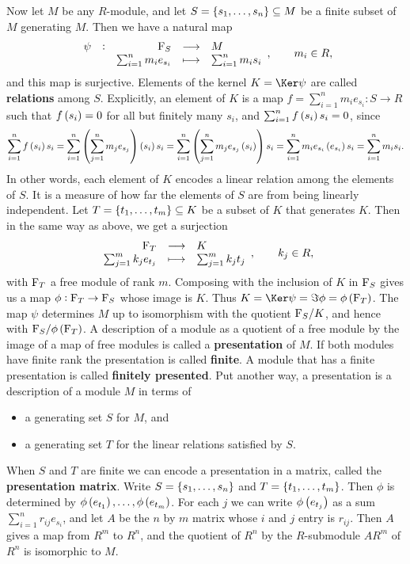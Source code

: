 Now let $ M $ be any $ R $-module, and let $ S = \cbr{s_1, \dots, s_n} \subseteq M $ be a finite subset of $ M $ generating $ M $. Then we have a natural map
$$ \function[\psi]{\F_S}{M}{\sum_{i = 1}^n m_ie_{s_i}}{\sum_{i = 1}^n m_is_i}, \qquad m_i \in R, $$
and this map is surjective. Elements of the kernel $ K = \Ker \psi $ are called \textbf{relations} among $ S $. Explicitly, an element of $ K $ is a map $ f = \sum_{i = 1}^n m_ie_{s_i} : S \to R $ such that $ f\br{s_i} = 0 $ for all but finitely many $ s_i $, and $ \sum_{i = 1}^n f\br{s_i}s_i = 0 $, since
$$ \sum_{i = 1}^n f\br{s_i}s_i = \sum_{i = 1}^n \br{\sum_{j = 1}^n m_je_{s_j}}\br{s_i}s_i = \sum_{i = 1}^n \br{\sum_{j = 1}^n m_je_{s_j}\br{s_i}}s_i = \sum_{i = 1}^n m_ie_{s_i}\br{e_{s_i}}s_i = \sum_{i = 1}^n m_is_i. $$
In other words, each element of $ K $ encodes a linear relation among the elements of $ S $. It is a measure of how far the elements of $ S $ are from being linearly independent. Let $ T = \cbr{t_1, \dots, t_m} \subseteq K $ be a subset of $ K $ that generates $ K $. Then in the same way as above, we get a surjection
$$ \function{\F_T}{K}{\sum_{j = 1}^m k_je_{t_j}}{\sum_{j = 1}^m k_jt_j}, \qquad k_j \in R, $$
with $ \mathrm{F}_T $ a free module of rank $ m $. Composing with the inclusion of $ K $ in $ \mathrm{F}_S $ gives us a map $ \phi : \mathrm{F}_T \to \mathrm{F}_S $ whose image is $ K $. Thus $ K = \Ker \psi = \Im \phi = \phi\br{\F_T} $. The map $ \psi $ determines $ M $ up to isomorphism with the quotient $ \mathrm{F}_S / K $, and hence with $ \F_S / \phi\br{\F_T} $. A description of a module as a quotient of a free module by the image of a map of free modules is called a \textbf{presentation} of $ M $. If both modules have finite rank the presentation is called \textbf{finite}. A module that has a finite presentation is called \textbf{finitely presented}. Put another way, a presentation is a description of a module $ M $ in terms of
\begin{itemize}
\item a generating set $ S $ for $ M $, and
\item a generating set $ T $ for the linear relations satisfied by $ S $.
\end{itemize}

When $ S $ and $ T $ are finite we can encode a presentation in a matrix, called the \textbf{presentation matrix}. Write $ S = \cbr{s_1, \dots, s_n} $ and $ T = \cbr{t_1, \dots, t_m} $. Then $ \phi $ is determined by $ \phi\br{e_{t_1}}, \dots, \phi\br{e_{t_m}} $. For each $ j $ we can write $ \phi\br{e_{t_j}} $ as a sum $ \sum_{i = 1}^n r_{ij}e_{s_i} $, and let $ A $ be the $ n $ by $ m $ matrix whose $ i $ and $ j $ entry is $ r_{ij} $. Then $ A $ gives a map from $ R^m $ to $ R^n $, and the quotient of $ R^n $ by the $ R $-submodule $ AR^m $ of $ R^n $ is isomorphic to $ M $.

